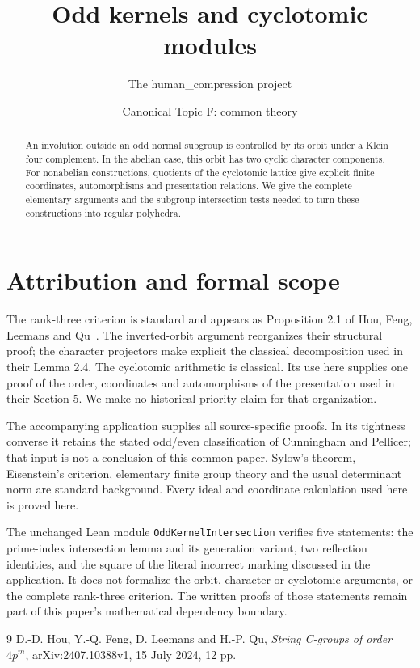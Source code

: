
\title{Odd kernels and cyclotomic modules}
\author{The human\_compression project}
\date{Canonical Topic F: common theory}

\maketitle
\begin{abstract}
An involution outside an odd normal subgroup is controlled by its orbit
under a Klein four complement. In the abelian case, this orbit has two
cyclic character components. For nonabelian constructions, quotients of
the cyclotomic lattice give explicit finite coordinates, automorphisms
and presentation relations. We give the complete elementary arguments
and the subgroup intersection tests needed to turn these constructions
into regular polyhedra.
\end{abstract}



\section{Attribution and formal scope}
The rank-three criterion is standard and appears as Proposition 2.1 of
Hou, Feng, Leemans and Qu~\cite{HFLQ}. The inverted-orbit argument
reorganizes their structural proof; the character projectors make explicit
the classical decomposition used in their Lemma 2.4. The cyclotomic
arithmetic is classical. Its use here supplies one proof of the order,
coordinates and automorphisms of the presentation used in their Section 5.
We make no historical priority claim for that organization.

The accompanying application supplies all source-specific proofs. In its
tightness converse it retains the stated odd/even classification of
Cunningham and Pellicer; that input is not a conclusion of this common
paper. Sylow's theorem, Eisenstein's criterion, elementary finite group
theory and the usual determinant norm are standard background. Every
ideal and coordinate calculation used here is proved here.

The unchanged Lean module \texttt{OddKernelIntersection} verifies five
statements: the prime-index intersection lemma and its generation
variant, two reflection identities, and the square of the literal
incorrect marking discussed in the application. It does not formalize
the orbit, character or cyclotomic arguments, or the complete
rank-three criterion. The written proofs of those statements remain
part of this paper's mathematical dependency boundary.
\begin{thebibliography}{9}
 D.-D. Hou, Y.-Q. Feng, D. Leemans and H.-P. Qu,
\emph{String C-groups of order $4p^m$}, arXiv:2407.10388v1,
15 July 2024, 12 pp.
\end{thebibliography}

